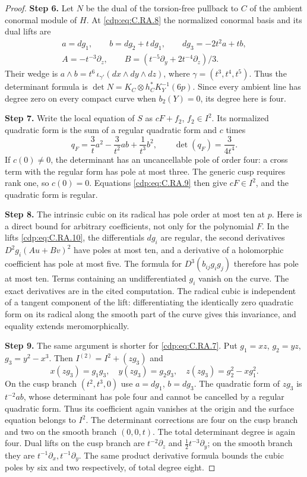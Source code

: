 \begin{proof}
\noindent\textbf{Step 6.} Let $N$ be the dual of the torsion-free pullback to $C$ of
the ambient conormal module of $H$. At \eqref{cdp:eq:C.RA.8} the
normalized conormal basis and its dual lifts are
\[
\begin{gathered}
 a=dg_1,\qquad b=dg_2+t\,dg_1,\qquad
 dg_3=-2t^2a+tb,\\
 A=-t^{-3}\partial_z,\qquad
 B=(t^{-5}\partial_y+2t^{-4}\partial_z)/3 .
\end{gathered}                                  \tag{C.RA.10}\label{cdp:eq:C.RA.10}
\]
Their wedge is $a\wedge b=t^6\,\iota_{\gamma'}(dx\wedge
dy\wedge dz)$, where $\gamma=(t^3,t^4,t^5)$.
Thus the determinant formula is
$\det N=K_C\otimes h_C^*K_Y^{-1}(6p)$.
Since every ambient line has degree zero on every compact
curve when $b_2(Y)=0$, its degree here is four.

\noindent\textbf{Step 7.} Write the local equation of $S$ as $cF+f_2$, $f_2\in I^2$.
Its normalized quadratic form is the sum of a regular
quadratic form and $c$ times
\[
 q_F=\frac3t a^2-\frac3{t^2}ab+\frac1{t^3}b^2,
 \qquad \det(q_F)=\frac3{4t^4}.                  \tag{C.RA.11}\label{cdp:eq:C.RA.11}
\]
If $c(0)\ne0$, the determinant has an uncancellable
pole of order four: a cross term with the regular form
has pole at most three. The generic cusp requires rank
one, so $c(0)=0$. Equations \eqref{cdp:eq:C.RA.9} then give
$cF\in I^2$, and the quadratic form is regular.

\noindent\textbf{Step 8.} The intrinsic cubic on its radical has pole order at most
ten at $p$. Here is a direct bound for arbitrary coefficients,
not only for the polynomial $F$. In the lifts \eqref{cdp:eq:C.RA.10},
the differentials $dg_i$ are regular, the second derivatives
$D^2g_i(Au+Bv)^2$ have poles at most ten, and a derivative
of a holomorphic coefficient has pole at most five.
The formula for $D^3(b_{ij}g_i g_j)$ therefore has pole
at most ten. Terms containing an undifferentiated $g_i$
vanish on the curve. The exact derivatives are in the cited computation.
The radical cubic is independent of a tangent component
of the lift: differentiating the identically zero quadratic
form on its radical along the smooth part of the curve
gives this invariance, and equality extends meromorphically.

\noindent\textbf{Step 9.} The same argument is shorter for \eqref{cdp:eq:C.RA.7}. Put
$g_1=xz$, $g_2=yz$, $g_3=y^2-x^3$. Then
$I^{(2)}=I^2+(z g_3)$ and
\[
 x(zg_3)=g_1g_3,\quad y(zg_3)=g_2g_3,\quad
 z(zg_3)=g_2^2-xg_1^2.
 \tag{C.RA.12}\label{cdp:eq:C.RA.12}
\]
On the cusp branch $(t^2,t^3,0)$ use $a=dg_1$, $b=dg_3$.
The quadratic form of $z g_3$ is $t^{-2}ab$, whose
determinant has pole four and cannot be cancelled by a
regular quadratic form. Thus its coefficient again
vanishes at the origin and the surface equation belongs
to $I^2$. The determinant corrections are four on the
cusp branch and two on the smooth branch $(0,0,t)$.
The total determinant degree is again four.
Dual lifts on the cusp branch are
$t^{-2}\partial_z$ and $\frac12t^{-3}\partial_y$;
on the smooth branch they are
$t^{-1}\partial_x,t^{-1}\partial_y$.
The same product derivative formula bounds the cubic
poles by six and two respectively, of total degree eight.


\end{proof}
